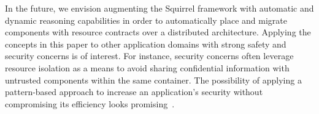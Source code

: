 In the future, we envision augmenting the Squirrel framework with automatic and dynamic reasoning capabilities in order to automatically place and migrate components with resource contracts over a distributed architecture.
Applying the concepts in this paper to other application domains with strong safety and security concerns is of interest.
For instance, security concerns often leverage resource isolation as a means to avoid sharing confidential information with untrusted components within the same container.
The possibility of applying a pattern-based approach to increase an application's security without compromising its efficiency looks promising~\cite{DBLP:conf/kbse/MorinMFTBJ10}.



